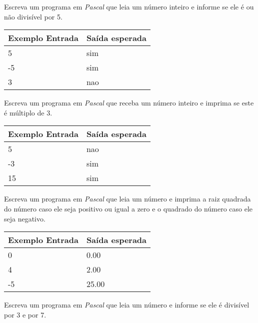 \item Escreva um programa em \emph{Pascal} que leia um número inteiro e 
informe se ele é ou não divisível por 5.

\begin{center}
\begin{tabular}{|l|l|} \hline
Exemplo Entrada & Saída esperada \\ \hline
5                & sim               \\ \hline
-5                & sim               \\ \hline
3                &  nao              \\ \hline
\end{tabular}
\end{center}

\item Escreva um programa em \emph{Pascal} que receba um número inteiro e 
imprima se este é múltiplo de 3.

\begin{center}
\begin{tabular}{|l|l|} \hline
Exemplo Entrada & Saída esperada \\ \hline
5                & nao               \\ \hline
-3                & sim               \\ \hline
15                & sim               \\ \hline
\end{tabular}
\end{center}

\item Escreva um programa em \emph{Pascal} que leia um número e imprima a 
raiz quadrada do número caso ele seja positivo ou igual a zero e o quadrado 
do número caso ele seja negativo.

\begin{center}
\begin{tabular}{|l|l|} \hline
Exemplo Entrada & Saída esperada \\ \hline
0                & 0.00               \\ \hline
4                & 2.00               \\ \hline
-5               & 25.00               \\ \hline
\end{tabular}
\end{center}

\item Escreva um programa em \emph{Pascal} que leia um número e informe se ele 
é divisível por 3 e por 7.


